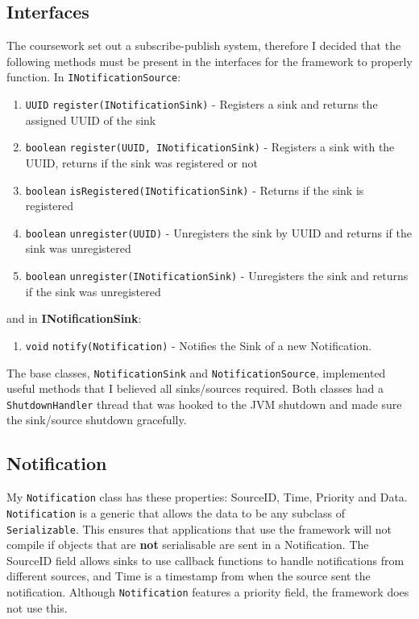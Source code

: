 \documentclass[a4paper]{article}
\begin{document}
\subsection{Interfaces}
The coursework set out a subscribe-publish system, therefore I decided that the following methods must be present in the interfaces for the framework to properly function.
In \texttt{INotificationSource}:
\begin{enumerate}
  \item \texttt{UUID} \texttt{register(INotificationSink)} - Registers a sink and returns the assigned UUID of the sink
  \item \texttt{boolean} \texttt{register(UUID, INotificationSink)} - Registers a sink with the UUID, returns if the sink was registered or not
  \item \texttt{boolean} \texttt{isRegistered(INotificationSink)} - Returns if the sink is registered
  \item \texttt{boolean} \texttt{unregister(UUID)} - Unregisters the sink by UUID and returns if the sink was unregistered
  \item \texttt{boolean} \texttt{unregister(INotificationSink)} - Unregisters the sink and returns if the sink was unregistered
\end{enumerate}
and in \textbf{INotificationSink}:
\begin{enumerate}
  \item \texttt{void} \texttt{notify(Notification)} - Notifies the Sink of a new Notification.
\end{enumerate}

The base classes, \texttt{NotificationSink} and \texttt{NotificationSource}, implemented useful methods that I believed all sinks/sources required.
Both classes had a \texttt{ShutdownHandler} thread that was hooked to the JVM shutdown and made sure the sink/source shutdown gracefully.


\subsection{Notification}
My \texttt{Notification} class has these properties: SourceID, Time, Priority and Data.
\texttt{Notification} is a generic that allows the data to be any  subclass of \texttt{Serializable}.
This ensures that applications that use the framework will not compile if objects that are \textbf{not} serialisable are sent in a Notification.
The SourceID field allows sinks to use callback functions to handle notifications from different sources, and Time is a timestamp from when the source sent the notification.
Although \texttt{Notification} features a priority field, the framework does not use this.
\end{document}
